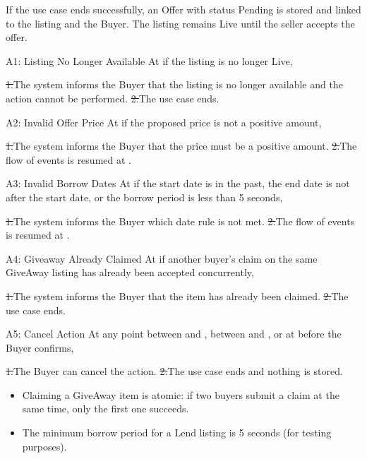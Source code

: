 If the use case ends successfully, an Offer with status Pending is stored and linked to the listing and the Buyer. The listing remains Live until the seller accepts the offer.\par
{}
\begin{flowblock}{A1: Listing No Longer Available}
At  if the listing is no longer Live,\par
\st{1.}{The system informs the Buyer that the listing is no longer available and the action cannot be performed.}
\st{2.}{The use case ends.}
\end{flowblock}
\begin{flowblock}{A2: Invalid Offer Price}
At  if the proposed price is not a positive amount,\par
\st{1.}{The system informs the Buyer that the price must be a positive amount.}
\st{2.}{The flow of events is resumed at .}
\end{flowblock}
\begin{flowblock}{A3: Invalid Borrow Dates}
At  if the start date is in the past, the end date is not after the start date, or the borrow period is less than 5 seconds,\par
\st{1.}{The system informs the Buyer which date rule is not met.}
\st{2.}{The flow of events is resumed at .}
\end{flowblock}
\begin{flowblock}{A4: Giveaway Already Claimed}
At  if another buyer's claim on the same GiveAway listing has already been accepted concurrently,\par
\st{1.}{The system informs the Buyer that the item has already been claimed.}
\st{2.}{The use case ends.}
\end{flowblock}
\begin{flowblock}{A5: Cancel Action}
At any point between  and , between  and , or at  before the Buyer confirms,\par
\st{1.}{The Buyer can cancel the action.}
\st{2.}{The use case ends and nothing is stored.}
\end{flowblock}
\begin{itemize}
  \item Claiming a GiveAway item is atomic: if two buyers submit a claim at the same time, only the first one succeeds.
  \item The minimum borrow period for a Lend listing is 5 seconds (for testing purposes).
\end{itemize}


